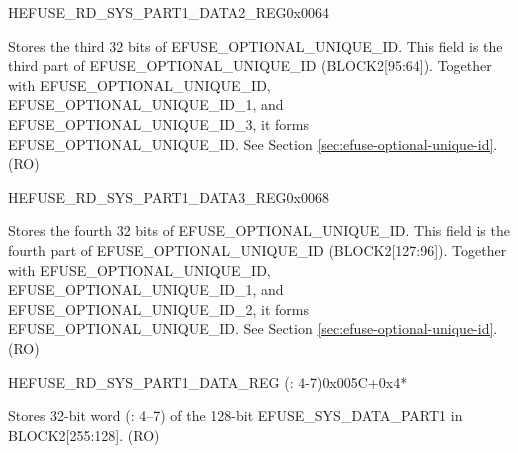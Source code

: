 \begin{register}{H}{EFUSE\_RD\_SYS\_PART1\_DATA2\_REG}{0x0064}\label{regdesc:EFUSERDSYSPART1DATA2REG}
%
\regnewline%
\begin{regdesc}\begin{reglist}
\label{fielddesc:EFUSEOPTIONALUNIQUEID2}\item [EFUSE\_OPTIONAL\_UNIQUE\_ID\_2] Stores the third 32 bits of EFUSE\_OPTIONAL\_UNIQUE\_ID. This field is the third part of EFUSE\_OPTIONAL\_UNIQUE\_ID (BLOCK2[95:64]). Together with EFUSE\_OPTIONAL\_UNIQUE\_ID, EFUSE\_OPTIONAL\_UNIQUE\_ID\_1, and EFUSE\_OPTIONAL\_UNIQUE\_ID\_3, it forms EFUSE\_OPTIONAL\_UNIQUE\_ID. See Section \ref{sec:efuse-optional-unique-id}. (RO)
\end{reglist}\end{regdesc}
\end{register}


\begin{register}{H}{EFUSE\_RD\_SYS\_PART1\_DATA3\_REG}{0x0068}\label{regdesc:EFUSERDSYSPART1DATA3REG}
%
\regnewline%
\begin{regdesc}\begin{reglist}
\label{fielddesc:EFUSEOPTIONALUNIQUEID3}\item [EFUSE\_OPTIONAL\_UNIQUE\_ID\_3] Stores the fourth 32 bits of EFUSE\_OPTIONAL\_UNIQUE\_ID. This field is the fourth part of EFUSE\_OPTIONAL\_UNIQUE\_ID (BLOCK2[127:96]). Together with EFUSE\_OPTIONAL\_UNIQUE\_ID, EFUSE\_OPTIONAL\_UNIQUE\_ID\_1, and EFUSE\_OPTIONAL\_UNIQUE\_ID\_2, it forms EFUSE\_OPTIONAL\_UNIQUE\_ID. See Section \ref{sec:efuse-optional-unique-id}. (RO)
\end{reglist}\end{regdesc}
\end{register}


\begin{register}{H}{EFUSE\_RD\_SYS\_PART1\_DATA\_REG (: 4-7)}{0x005C+0x4*}\label{regdesc:EFUSERDSYSPART1DATA4TO7REG}
%
\regnewline%
\begin{regdesc}\begin{reglist}
\label{fielddesc:EFUSESYSDATAPART1N}\item [EFUSE\_SYS\_DATA\_PART1\_\regindex{n}] Stores 32-bit word  (: 4–7) of the 128-bit EFUSE\_SYS\_DATA\_PART1 in BLOCK2[255:128]. (RO)
\end{reglist}\end{regdesc}
\end{register}


